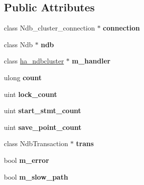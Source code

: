 \subsection*{Public Attributes}
\begin{DoxyCompactItemize}
\item 
\mbox{\label{classThd__ndb_a0879ca563607f1dcb342cdfc87497e20}} 
class Ndb\+\_\+cluster\+\_\+connection $\ast$ {\bfseries connection}
\item 
\mbox{\label{classThd__ndb_aceb59fa3005477dfaea2a802d9264ec9}} 
class Ndb $\ast$ {\bfseries ndb}
\item 
\mbox{\label{classThd__ndb_ac18d66f13b8b2b37ab7c0bfd0fc094bd}} 
class \mbox{\hyperlink{classha__ndbcluster}{ha\+\_\+ndbcluster}} $\ast$ {\bfseries m\+\_\+handler}
\item 
\mbox{\label{classThd__ndb_a999f57334b5c07130f3d615198935c2a}} 
ulong {\bfseries count}
\item 
\mbox{\label{classThd__ndb_a19d5f668671024169ab032511bc26a75}} 
uint {\bfseries lock\+\_\+count}
\item 
\mbox{\label{classThd__ndb_ad2e38418f64bf1cdff8940bf553d631c}} 
uint {\bfseries start\+\_\+stmt\+\_\+count}
\item 
\mbox{\label{classThd__ndb_a2cca1ab8ffc90705e36f83016262ae82}} 
uint {\bfseries save\+\_\+point\+\_\+count}
\item 
\mbox{\label{classThd__ndb_a6cdfa1ad7132902105909cb9f75b7eed}} 
class Ndb\+Transaction $\ast$ {\bfseries trans}
\item 
\mbox{\label{classThd__ndb_a02c73b243bf4fa3865aa40570b5bd74e}} 
bool {\bfseries m\+\_\+error}
\item 
\mbox{\label{classThd__ndb_a9701d4d83575b3c43ce8160fc2b47fba}} 
bool {\bfseries m\+\_\+slow\+\_\+path}
\item 
\mbox{\label{classThd__ndb_ab64e272166964781bd2090c46867973d}} 

\end{DoxyCompactItemize}
